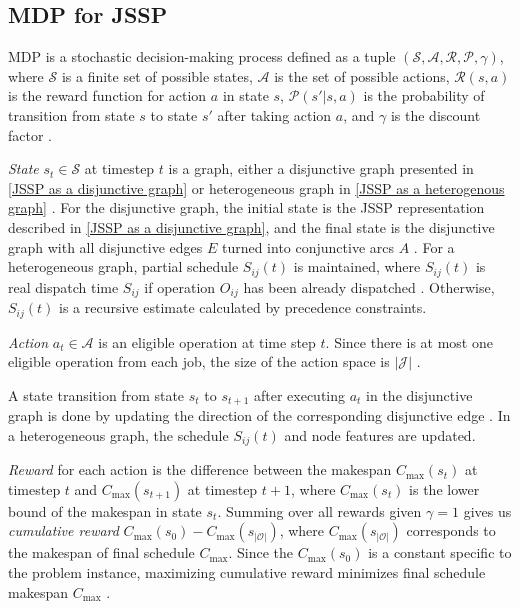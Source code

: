 \subsection{MDP for JSSP} \label{MDP for JSSP}

MDP is a stochastic decision-making process defined as a tuple $(\mathcal{S}, \mathcal{A}, \mathcal{R}, \mathcal{P}, \gamma)$, where $\mathcal{S}$ is a finite set of possible states, $\mathcal{A}$ is the set of possible actions, $\mathcal{R}(s, a)$ is the reward function for action $a$ in state $s$,  $\mathcal{P} (s' | s, a)$ is the probability of transition from state $s$ to state $s'$ after taking action $a$, and $\gamma$ is the discount factor \cite{10226873, jssp_rl_env}. 
\par
\textit{State} $s_t \in \mathcal{S}$ at timestep $t$ is a graph, either a disjunctive graph presented in \ref{JSSP as a disjunctive graph} \cite{zhang2020learning} or heterogeneous graph in \ref{JSSP as a heterogenous graph} \cite{10226873}. For the disjunctive graph, the initial state is the JSSP representation described in \ref{JSSP as a disjunctive graph}, and the final state is the disjunctive graph with all disjunctive edges $E$ turned into conjunctive arcs $A$ \cite{zhang2020learning}. For a heterogeneous graph, partial schedule $S_{ij}(t)$ is maintained, where $S_{ij}(t)$ is real dispatch time $S_{ij}$ if operation $O_{ij}$ has been already dispatched \cite{9826438}. Otherwise, $S_{ij}(t)$ is a recursive estimate calculated by precedence constraints.
\par
\textit{Action} $a_t \in \mathcal{A}$ is an eligible operation at time step $t$. Since there is at most one eligible operation from each job, the size of the action space is $\left|\mathcal{J}\right|$ \cite{zhang2020learning}.
\par
A state transition from state $s_t$ to $s_{t+1}$ after executing $a_t$ in the disjunctive graph is done by updating the direction of the corresponding disjunctive edge \cite{zhang2020learning}. In a heterogeneous graph, the schedule $S_{ij}(t)$ and node features are updated.

\textit{Reward} for each action is the difference between the makespan $C_\text{max}(s_t)$ at timestep $t$ and $C_\text{max}(s_{t+1})$ at timestep $t+1$, where $C_\text{max}(s_t)$ is the lower bound of the makespan in state $s_t$. Summing over all rewards given $\gamma = 1$ gives us \textit{cumulative reward} $C_\text{max}(s_0) - C_\text{max}(s_{\left|\mathcal{O}\right|})$, where $C_\text{max}(s_{\left|\mathcal{O}\right|})$ corresponds to the makespan of final schedule $C_\text{max}$. Since the $C_\text{max}(s_0)$ is a constant specific to the problem instance, maximizing cumulative reward minimizes final schedule makespan $C_\text{max}$ \cite{zhang2020learning, 9826438, 10226873}. 

